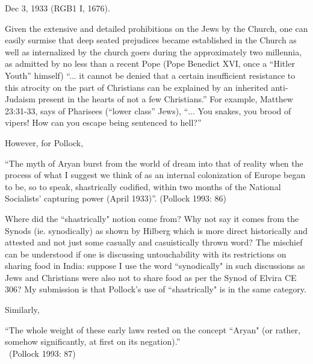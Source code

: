 Dec 3, 1933 (RGB1 I, 1676).

Given the extensive and detailed prohibitions on the Jews by the Church, one can easily surmise that deep seated prejudices became established in the Church as well as internalized by the church goers during the approximately two millennia, as admitted by no less than a recent Pope (Pope Benedict XVI, once a ``Hitler Youth'' himself) “... it cannot be denied that a certain insufficient resistance to this atrocity on the part of Christians can be explained by an inherited anti-Judaism present in the hearts of not a few Christians.” For example, Matthew 23:31-33, says of Pharisees (“lower class” Jews), “$\ldots$ You snakes, you brood of vipers! How can you escape being sentenced to hell?”

However, for Pollock, 
\begin{myquote}
“The myth of Aryan burst from the world of dream into that of reality when the process of what I suggest we think of as an internal colonization of Europe began to be, so to speak, shastrically codified, within two months of the National Socialists' capturing power (April 1933)”. 	\hfill (Pollock 1993: 86)
\end{myquote}

Where did the ``shastrically" notion come from? Why not say it comes from the Synods (ie. synodically) as shown by Hilberg which is more direct historically and attested and not just some casually and casuistically thrown word? The mischief can be understood if one is discussing untouchability with its restrictions on sharing food in India: suppose I use the word ``synodically" in such discussions as Jews and Christians were also not to share food as per the Synod of Elvira CE 306? My submission is that Pollock's use of ``shastrically" is in the same category.

Similarly, 
\begin{myquote}
``The whole weight of these early laws rested on the concept ``Aryan" (or rather, somehow significantly, at first on its negation).”\\[-15pt]

~\hfill(Pollock 1993: 87)
\end{myquote}

